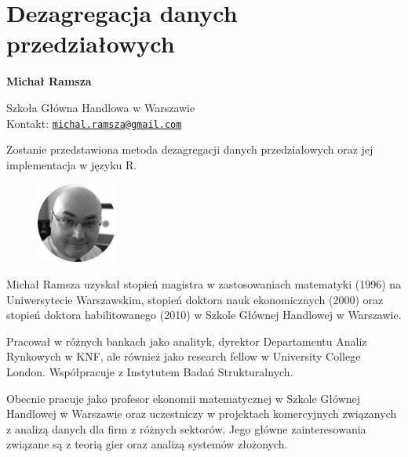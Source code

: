 \documentclass[\main/boa.tex]{subfiles}
\begin{document}
\section{Dezagregacja danych przedziałowych}


\begin{minipage}{0.915\textwidth}
	\centering
  {\bf \LARGE {} Michał Ramsza}
\end{minipage}


\begin{affiliations}
\begin{minipage}{0.915\textwidth}
\centering
\large Szkoła Główna Handlowa w Warszawie \\[1pt]
Kontakt: \href{mailto:michal.ramsza@gmail.com}{\nolinkurl{michal.ramsza@gmail.com}}\\
\end{minipage}
\end{affiliations}


Zostanie przedstawiona metoda dezagregacji danych przedziałowych oraz jej implementacja w języku R. 

\bio
\begin{figure}
    \includegraphics[width=100px]{img/guests/czarno_biale/mramsza-crop.png}
\end{figure} 
Michał Ramsza uzyskał stopień magistra w zastosowaniach matematyki (1996) na Uniwersytecie Warszawskim, stopień doktora nauk ekonomicznych (2000) oraz stopień doktora habilitowanego (2010) w Szkole Głównej Handlowej w Warszawie.

Pracował w różnych bankach jako analityk, dyrektor Departamentu Analiz Rynkowych w KNF, ale również jako research fellow w University College London. Współpracuje z Instytutem Badań Strukturalnych.

Obecnie pracuje jako profesor ekonomii matematycznej w Szkole Głównej Handlowej w Warszawie oraz uczestniczy w projektach komercyjnych związanych z analizą danych dla firm z różnych sektorów. Jego główne zainteresowania związane są z teorią gier oraz analizą systemów złożonych.
\end{document}
